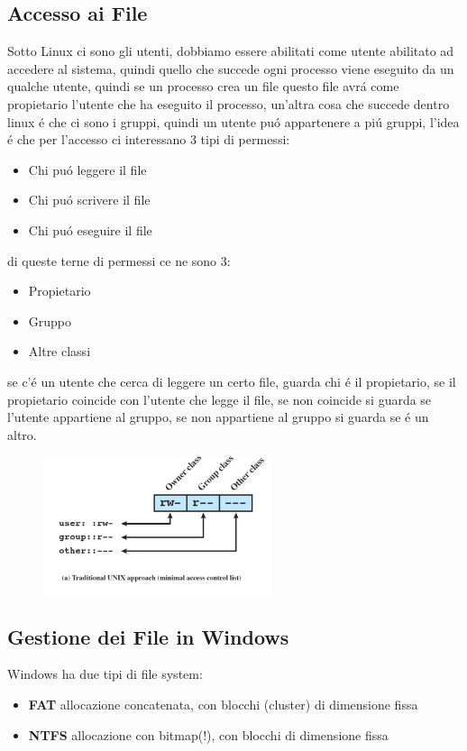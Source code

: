 \subsection*{Accesso ai File}
Sotto Linux ci sono gli utenti, dobbiamo essere abilitati come utente abilitato ad accedere al sistema, quindi quello che succede
ogni processo viene eseguito da un qualche utente, quindi se un processo crea un file questo file avrá come propietario l'utente che
ha eseguito il processo, un'altra cosa che succede dentro linux é che ci sono i gruppi, quindi un utente puó appartenere a piú gruppi,
l'idea é che per l'accesso ci interessano 3 tipi di permessi:
\begin{itemize}
    \item Chi puó leggere il file
    \item Chi puó scrivere il file
    \item Chi puó eseguire il file
\end{itemize}
di queste terne di permessi ce ne sono 3:
\begin{itemize}
    \item Propietario
    \item Gruppo
    \item Altre classi
\end{itemize}
se c'é un utente che cerca di leggere un certo file, guarda chi é il propietario, se il propietario coincide con l'utente che
legge il file, se non coincide si guarda se l'utente appartiene al gruppo, se non appartiene al gruppo si guarda se é un altro.
\begin{figure}[H]
    \centering
    \includegraphics[width=0.6\textwidth]{immagini/AccessoAiFile}
\end{figure}
\subsection{Gestione dei File in Windows}
Windows ha due tipi di file system:
\begin{itemize}
    \item \textbf{FAT} allocazione concatenata, con blocchi (cluster) di dimensione fissa
    \item \textbf{NTFS} allocazione con bitmap(!), con blocchi di dimensione fissa
    \end{itemize}
